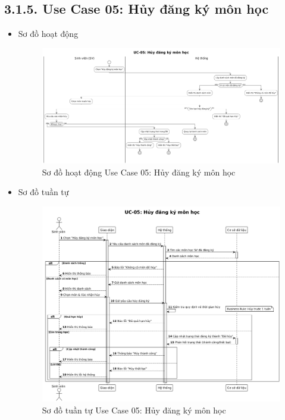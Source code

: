 \subsection*{3.1.5. Use Case 05: Hủy đăng ký môn học}
\begin{itemize}
    \item Sơ đồ hoạt động
    \begin{figure}[H]
    \centering
    \includegraphics[scale=0.3 ]{Picture/ACUC05.png}
    \caption{Sơ đồ hoạt động Use Case 05: Hủy đăng ký môn học}
    \end{figure}
    \item Sơ đồ tuần tự
    \begin{figure}[H]
    \centering
    \includegraphics[scale=0.35 ]{Picture/SEUC05.png}
    \caption{Sơ đồ tuần tự Use Case 05: Hủy đăng ký môn học}
    \end{figure}
\end{itemize}
